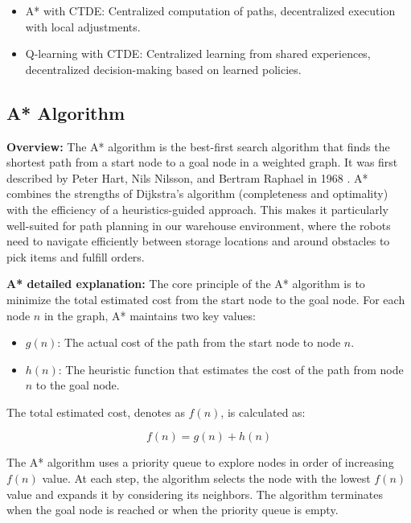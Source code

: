 \documentclass{kththesis}
\begin{document}
\begin{itemize}
    \item A* with CTDE: Centralized computation of paths, decentralized execution with local adjustments.
    \item Q-learning with CTDE: Centralized learning from shared experiences, decentralized decision-making based on learned policies.

\end{itemize}

\subsection{A* Algorithm}

\textbf{Overview:}
The A* algorithm is the best-first search algorithm that finds the shortest path from a start node to a goal node in a weighted graph. It was first described by Peter Hart, Nils Nilsson, and Bertram Raphael in 1968 \parencite{Hart68}. A* combines the strengths of Dijkstra's algorithm (completeness and optimality) with the efficiency of a heuristics-guided approach. This makes it particularly well-suited for path planning in our warehouse environment, where the robots need to navigate efficiently between storage locations and around obstacles to pick items and fulfill orders.

\textbf{A* detailed explanation:}
The core principle of the A* algorithm is to minimize the total estimated cost from the start node to the goal node. For each node $n$ in the graph, A* maintains two key values:

\begin{itemize}
    \item $g(n)$: The actual cost of the path from the start node to node $n$.
    \item $h(n)$: The heuristic function that estimates the cost of the path from node $n$ to the goal node.
\end{itemize}

The total estimated cost, denotes as $f(n)$, is calculated as:

\begin{equation}
    f(n) = g(n) + h(n)
\end{equation}

The A* algorithm uses a priority queue to explore nodes in order of increasing $f(n)$ value. At each step, the algorithm selects the node with the lowest $f(n)$ value and expands it by considering its neighbors. The algorithm terminates when the goal node is reached or when the priority queue is empty.
\end{document}
